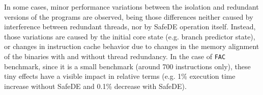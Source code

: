 
In some cases, minor performance variations between the isolation and redundant versions of the programs are observed, being those differences neither caused by interference between redundant threads, nor by SafeDE operation itself. Instead, those variations are caused by the initial core state (e.g. branch predictor state), or changes in instruction cache behavior due to changes in the memory alignment of the binaries with and without thread redundancy.
In the case of \texttt{FAC} benchmark, since it is a small benchmark (around 700 instructions only), these tiny effects have a visible impact in relative terms (e.g. 1\% execution time increase without SafeDE and 0.1\% decrease with SafeDE). 



